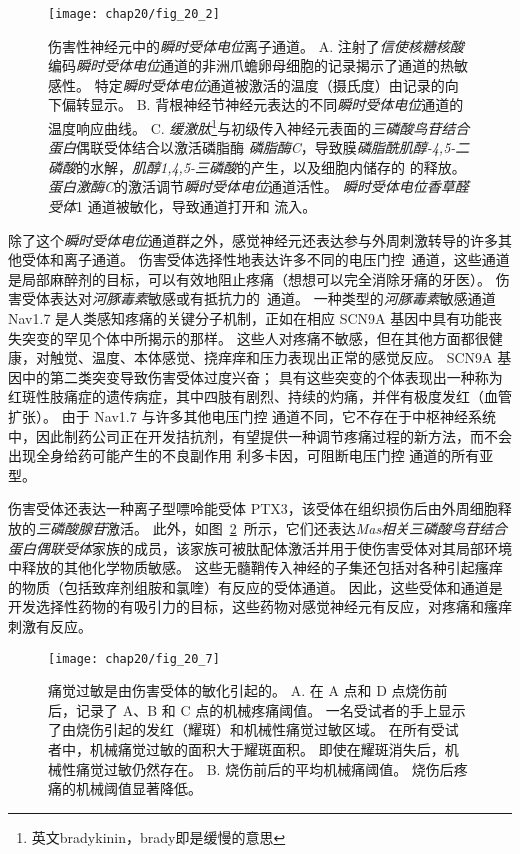 \begin{figure}[htbp]
	\centering
	\texttt{[image: chap20/fig\_20\_2]}
	\caption{伤害性神经元中的\textit{瞬时受体电位}离子通道。
		A. 注射了\textit{信使核糖核酸}编码\textit{瞬时受体电位}通道的非洲爪蟾卵母细胞的记录揭示了通道的热敏感性。
		特定\textit{瞬时受体电位}通道被激活的温度（摄氏度）由记录的向下偏转显示\cite{tominaga2004thermosensation}。
		B. 背根神经节神经元表达的不同\textit{瞬时受体电位}通道的温度响应曲线\cite{jordt2003lessons}。
		C. \textit{缓激肽}\footnote{英文bradykinin，brady即是缓慢的意思}与初级传入神经元表面的\textit{三磷酸鸟苷结合蛋白}偶联受体结合以激活磷脂酶 \textit{磷脂酶C}，导致膜\textit{磷脂酰肌醇-4,5-二磷酸}的水解，\textit{肌醇1,4,5-三磷酸}的产生，以及细胞内储存的  的释放。
		\textit{蛋白激酶C}的激活调节\textit{瞬时受体电位}通道活性。 
		\textit{瞬时受体电位香草醛受体}1 通道被敏化，导致通道打开和  流入\cite{bautista2006trpa1}。}
	\label{fig:20_2}
\end{figure}


除了这个\textit{瞬时受体电位}通道群之外，感觉神经元还表达参与外周刺激转导的许多其他受体和离子通道。
伤害受体选择性地表达许多不同的电压门控~通道，这些通道是局部麻醉剂的目标，可以有效地阻止疼痛（想想可以完全消除牙痛的牙医）。
伤害受体表达对\textit{河豚毒素}敏感或有抵抗力的~通道。
一种类型的\textit{河豚毒素}敏感通道 Nav1.7 是人类感知疼痛的关键分子机制，正如在相应 SCN9A 基因中具有功能丧失突变的罕见个体中所揭示的那样。
这些人对疼痛不敏感，但在其他方面都很健康，对触觉、温度、本体感觉、挠痒痒和压力表现出正常的感觉反应。 
SCN9A 基因中的第二类突变导致伤害受体过度兴奋； 具有这些突变的个体表现出一种称为红斑性肢痛症的遗传病症，其中四肢有剧烈、持续的灼痛，并伴有极度发红（血管扩张）。
由于 Nav1.7 与许多其他电压门控  通道不同，它不存在于中枢神经系统中，因此制药公司正在开发拮抗剂，有望提供一种调节疼痛过程的新方法，而不会出现全身给药可能产生的不良副作用 利多卡因，可阻断电压门控  通道的所有亚型。


伤害受体还表达一种离子型嘌呤能受体 PTX3，该受体在组织损伤后由外周细胞释放的\textit{三磷酸腺苷}激活。
此外，如图~\ref{fig:20_7}~所示，它们还表达\textit{Mas相关三磷酸鸟苷结合蛋白偶联受体}家族的成员，该家族可被肽配体激活并用于使伤害受体对其局部环境中释放的其他化学物质敏感。
这些无髓鞘传入神经的子集还包括对各种引起瘙痒的物质（包括致痒剂组胺和氯喹）有反应的受体通道。
因此，这些受体和通道是开发选择性药物的有吸引力的目标，这些药物对感觉神经元有反应，对疼痛和瘙痒刺激有反应。


\begin{figure}[htbp]
	\centering
	\texttt{[image: chap20/fig\_20\_7]}
	\caption{痛觉过敏是由伤害受体的敏化引起的\cite{raja1984evidence}。
		A. 在 A 点和 D 点烧伤前后，记录了 A、B 和 C 点的机械疼痛阈值。
		一名受试者的手上显示了由烧伤引起的发红（耀斑）和机械性痛觉过敏区域。
		在所有受试者中，机械痛觉过敏的面积大于耀斑面积。
		即使在耀斑消失后，机械性痛觉过敏仍然存在。
		B. 烧伤前后的平均机械痛阈值。
		烧伤后疼痛的机械阈值显著降低。}
	\label{fig:20_7}
\end{figure}


